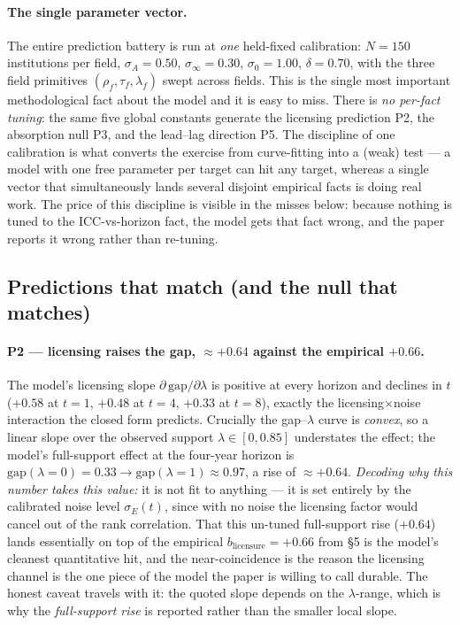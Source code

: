 \documentclass[11pt]{article}
\begin{document}
\paragraph{The single parameter vector.} The entire prediction battery is run at \emph{one} held-fixed calibration: $N=150$ institutions per field, $\sigma_A=0.50$, $\sigma_\infty=0.30$, $\sigma_0=1.00$, $\delta=0.70$, with the three field primitives $(\rho_f,\tau_f,\lambda_f)$ swept across fields. This is the single most important methodological fact about the model and it is easy to miss. There is \emph{no per-fact tuning}: the same five global constants generate the licensing prediction P2, the absorption null P3, and the lead--lag direction P5. The discipline of one calibration is what converts the exercise from curve-fitting into a (weak) test --- a model with one free parameter per target can hit any target, whereas a single vector that simultaneously lands several disjoint empirical facts is doing real work. The price of this discipline is visible in the misses below: because nothing is tuned to the ICC-vs-horizon fact, the model gets that fact wrong, and the paper reports it wrong rather than re-tuning.

\subsection{Predictions that match (and the null that matches)}

\paragraph{P2 --- licensing raises the gap, $\approx+0.64$ against the empirical $+0.66$.} The model's licensing slope $\partial\,\mathrm{gap}/\partial\lambda$ is positive at every horizon and declines in $t$ ($+0.58$ at $t{=}1$, $+0.48$ at $t{=}4$, $+0.33$ at $t{=}8$), exactly the licensing$\times$noise interaction the closed form predicts. Crucially the gap--$\lambda$ curve is \emph{convex}, so a linear slope over the observed support $\lambda\in[0,0.85]$ understates the effect; the model's full-support effect at the four-year horizon is $\mathrm{gap}(\lambda{=}0)=0.33 \to \mathrm{gap}(\lambda{=}1)\approx 0.97$, a rise of $\approx +0.64$. \emph{Decoding why this number takes this value:} it is not fit to anything --- it is set entirely by the calibrated noise level $\sigma_E(t)$, since with no noise the licensing factor would cancel out of the rank correlation. That this un-tuned full-support rise ($+0.64$) lands essentially on top of the empirical $b_{\text{licensure}}=+0.66$ from \S5 is the model's cleanest quantitative hit, and the near-coincidence is the reason the licensing channel is the one piece of the model the paper is willing to call durable. The honest caveat travels with it: the quoted slope depends on the $\lambda$-range, which is why the \emph{full-support rise} is reported rather than the smaller local slope.
\end{document}
